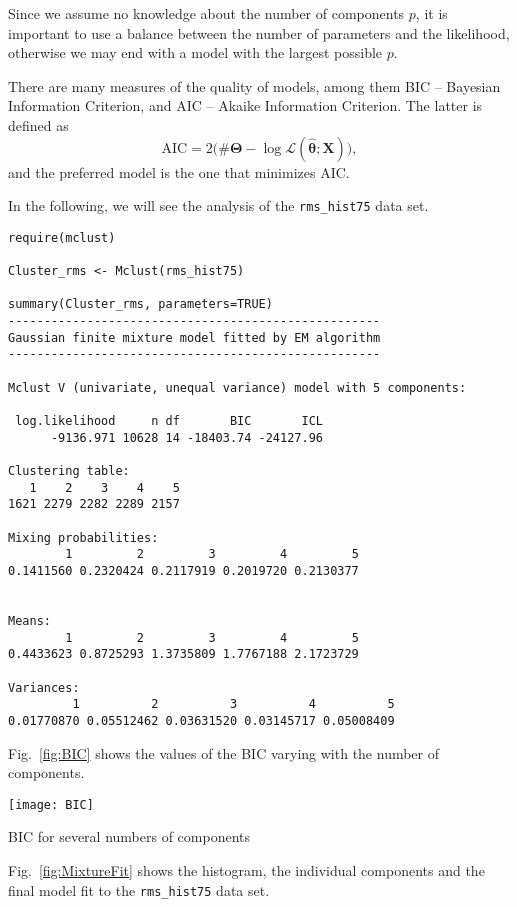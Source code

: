 Since we assume no knowledge about the number of components $p$, it is important to use a balance between the number of parameters and the likelihood, otherwise we may end with a model with the largest possible $p$.

There are many measures of the quality of models, among them BIC -- Bayesian Information Criterion, and AIC -- Akaike Information Criterion.
The latter is defined as
$$
\text{AIC} = 2\big(\#\bm\Theta - \log \mathcal L(\widehat{\bm{\theta}};\bm X)\big),
$$
and the preferred model is the one that minimizes AIC.

In the following, we will see the analysis of the \verb|rms_hist75| data set.

\begin{lstlisting}[frame=tb]
require(mclust)

Cluster_rms <- Mclust(rms_hist75)

summary(Cluster_rms, parameters=TRUE)
----------------------------------------------------
Gaussian finite mixture model fitted by EM algorithm 
----------------------------------------------------

Mclust V (univariate, unequal variance) model with 5 components:

 log.likelihood     n df       BIC       ICL
      -9136.971 10628 14 -18403.74 -24127.96

Clustering table:
   1    2    3    4    5 
1621 2279 2282 2289 2157 

Mixing probabilities:
        1         2         3         4         5 
0.1411560 0.2320424 0.2117919 0.2019720 0.2130377 


Means:
        1         2         3         4         5 
0.4433623 0.8725293 1.3735809 1.7767188 2.1723729 

Variances:
         1          2          3          4          5 
0.01770870 0.05512462 0.03631520 0.03145717 0.05008409 
\end{lstlisting}

Fig.~\ref{fig:BIC} shows the values of the BIC varying with the number of components.

\begin{marginfigure}
\centering
\texttt{[image: BIC]}
\caption{BIC for several numbers of components}
\label{fig:BIC}
\end{marginfigure}

Fig.~\ref{fig:MixtureFit} shows the histogram, the individual components and the final model fit to the \verb|rms_hist75| data set.

